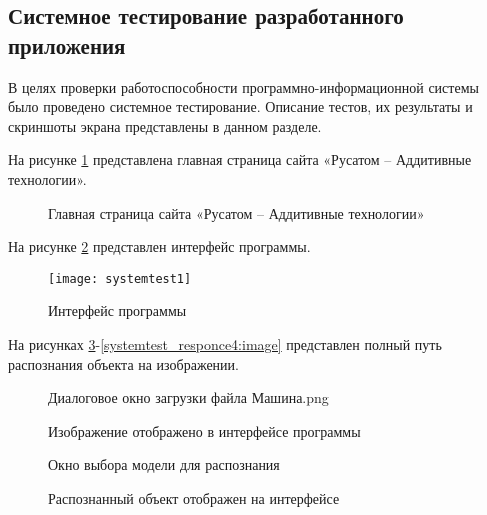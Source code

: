 \subsection{Системное тестирование разработанного приложения}
В целях проверки работоспособности программно-информационной системы было проведено системное тестирование. Описание тестов, их результаты и скриншоты экрана представлены в данном разделе.

На рисунке \ref{main:image} представлена главная страница сайта «Русатом – Аддитивные технологии».
\newpage %
\begin{figure}[H] %
\caption{Главная страница сайта «Русатом – Аддитивные технологии»}
\label{main:image}
\end{figure}

На рисунке \ref{systemtest1:image} представлен интерфейс программы.
\begin{figure}[H]
\centering
\texttt{[image: systemtest1]}
\caption{Интерфейс программы}
\label{systemtest1:image}
\end{figure}

На рисунках \ref{systemtest_responce:image}-\ref{systemtest_responce4:image} представлен полный путь распознания объекта на изображении.

\begin{figure}[H]
\caption{Диалоговое окно загрузки файла Машина.png}
\label{systemtest_responce:image}
\end{figure}

\begin{figure}[H]
\caption{Изображение отображено в интерфейсе программы}
\label{systemtest_responce1:image}
\end{figure}

\begin{figure}[H]
\caption{Окно выбора модели для распознания}
\label{systemtest_responce2:image}
\end{figure}

\begin{figure}[H]
\caption{Распознанный объект отображен на интерфейсе}
\label{systemtest_responce3:image}
\end{figure}

